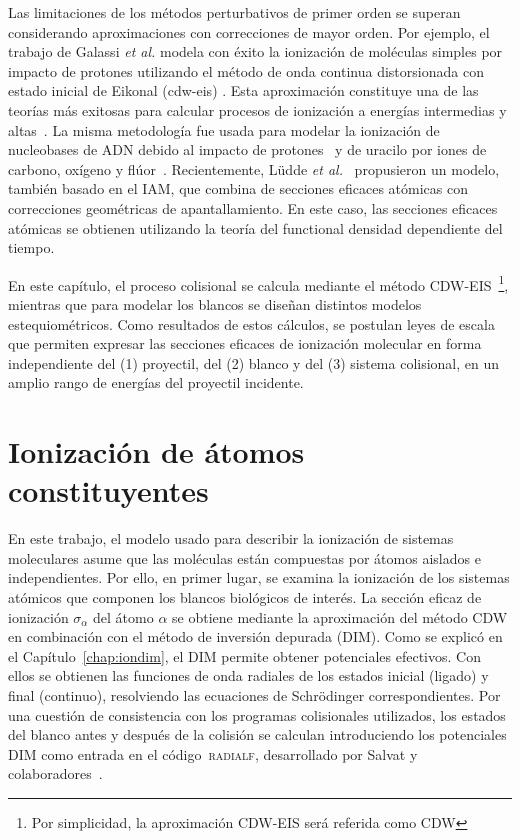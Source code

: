 Las limitaciones de los métodos perturbativos de primer orden se superan 
considerando aproximaciones con correcciones de mayor orden. 
Por ejemplo, el trabajo de Galassi \textit{et al.} \cite{Galassi:00} 
modela con éxito la ionización de moléculas simples por impacto de 
protones utilizando el método de onda continua distorsionada con estado 
inicial de Eikonal (\acs{cdw-eis}) \cite{Fainstein:88,Miraglia:08,
Miraglia:09}. Esta aproximación constituye una de las teorías más 
exitosas para calcular procesos de ionización a energías intermedias y 
altas~\cite{Miraglia:08,Miraglia:09,Montanari:17-iongasesnobles}. 
La misma metodología fue usada para modelar la ionización de nucleobases 
de ADN debido al impacto de protones~\cite{Galassi:12} y de uracilo por 
iones de carbono, oxígeno y flúor~\cite{champion2012,agnihotri2012,
agnihotri2013}. Recientemente, L\"udde \textit{et al.}~\cite{Ludde:16,
Ludde:18,Ludde:19,Ludde:20} propusieron un modelo, también basado en el 
IAM, que combina de secciones eficaces atómicas con correcciones 
geométricas de apantallamiento. En este caso, las secciones eficaces 
atómicas se obtienen utilizando la teoría del functional densidad 
dependiente del tiempo. 

En este capítulo, el proceso colisional se calcula mediante el método 
CDW-EIS~\footnote{Por simplicidad, la aproximación CDW-EIS será referida 
como CDW}, mientras que para modelar los blancos se diseñan distintos 
modelos estequiométricos. Como resultados de estos cálculos, se postulan 
leyes de escala que permiten expresar las secciones eficaces de 
ionización molecular en forma independiente del 
(1) proyectil, del (2) blanco y del (3) sistema colisional, en un 
amplio rango de energías del proyectil incidente.

\section{Ionización de átomos constituyentes}
\label{sec:atoms}

En este trabajo, el modelo usado para describir la ionización de 
sistemas moleculares asume que las moléculas están compuestas por átomos 
aislados e independientes. Por ello, en primer lugar, se examina la 
ionización de los sistemas atómicos que componen los blancos biológicos 
de interés. La sección eficaz de ionización $\sigma_{\alpha}$ del átomo 
$\alpha$ se obtiene mediante la aproximación del método CDW en 
combinación con el método de inversión depurada (DIM). Como se explicó 
en el Capítulo~\ref{chap:iondim}, el DIM permite obtener potenciales 
efectivos. Con ellos se obtienen las funciones de onda radiales de los 
estados inicial (ligado) y final (continuo), resolviendo las 
ecuaciones de Schr\"odinger correspondientes. Por una cuestión de 
consistencia con los programas colisionales utilizados, los estados del 
blanco antes y después de la colisión se calculan introduciendo los 
potenciales DIM como entrada en el código~\textsc{radialf}, desarrollado 
por Salvat y colaboradores~\cite{salvat1995}.

